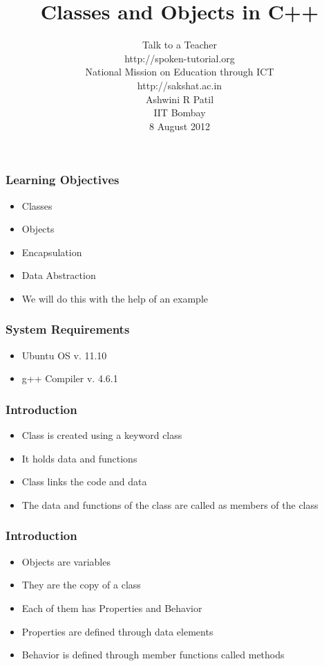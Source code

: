 \documentclass[17pt]{beamer}
\begin{document}
\sffamily \bfseries
\title
[Classes and Objects in C++ \hspace{0.75cm}]
{Classes and Objects in C++}
\author
[Ashwini R Patil]
{\small Talk to a Teacher \\http://spoken-tutorial.org \\ National Mission on Education
  through ICT \\ http://sakshat.ac.in \\ [0.6cm]
   Ashwini R Patil \\IIT Bombay \\[0.6cm]
{\small 8 August 2012}
}
\begin{frame}
   \titlepage
\end{frame}
\begin{frame}[fragile]
  \frametitle{Learning Objectives}\pause
  \begin{itemize}[<+-|alert@+>]
  \item Classes
  \item Objects
  \item Encapsulation
  \item Data Abstraction
  \item We will do this with the help of an example
  \end{itemize}
\end{frame}
\begin{frame}
  \frametitle {System Requirements} \pause
  \begin{itemize}[<+-|alert@+>]
  \item Ubuntu OS v. 11.10
  \item g++ Compiler v. 4.6.1
  \end{itemize}
\end{frame}


\begin{frame}
\frametitle{Introduction}\pause
\begin{itemize}[<+-|alert@+>]
  \item Class is created using a keyword class
  \item It holds data and functions 
  \item Class links the code and data
  \item The data and functions of the class are called as members of the class
\end{itemize}
\end{frame}

\begin{frame}
\frametitle{Introduction}\pause
\begin{itemize}[<+-|alert@+>]
  \item Objects are variables
\item They are the copy of a class
\item Each of them has Properties and Behavior
\item Properties are defined through data elements
\item Behavior is defined through member functions called methods
\end{itemize}
\end{frame}
\end{document}
